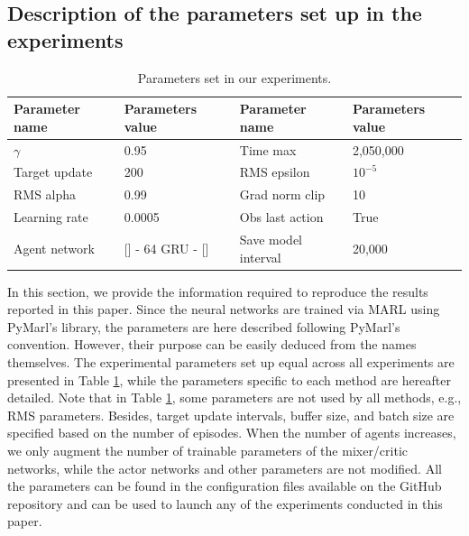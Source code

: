 \subsection{Description of the parameters set up in the experiments}

\begin{table}
  \caption{Parameters set in our experiments.}
  \label{tab:exp_details_common}
  \centering
  \begin{tabular}{llll}
    \toprule
    Parameter name & Parameters value & Parameter name & Parameters value \\
    \midrule
    $\gamma$ & 0.95 & Time max & 2,050,000 \\
    Target update & 200  & RMS epsilon &  $10^{-5}$ \\
    RMS alpha &  0.99  & Grad norm clip & 10 \\
    Learning rate & 0.0005 &Obs last action & True \\
    Agent network & [] - 64 GRU - [] &Save model interval & 20,000 \\
    \bottomrule
  \end{tabular}
\end{table}


In this section, we provide the information required to reproduce the results reported in this paper.
Since the neural networks are trained via MARL using PyMarl's \citep{samvelyan2019starcraft} library, the parameters are here described following PyMarl's convention.
However, their purpose can be easily deduced from the names themselves.
The experimental parameters set up equal across all experiments are presented in Table \ref{tab:exp_details_common}, while the parameters specific to each method are hereafter detailed.
Note that in Table \ref{tab:exp_details_common}, some parameters are not used by all methods, e.g., RMS parameters. Besides, target update intervals, buffer size, and batch size are specified based on the number of episodes.
When the number of agents increases, we only augment the number of trainable parameters of the mixer/critic networks, while the actor networks and other parameters are not modified.
All the parameters can be found in the configuration files available on the GitHub repository and can be used to launch any of the experiments conducted in this paper.

